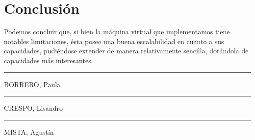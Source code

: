 \documentclass[a4paper,12pt]{article}
\begin{document}
\section{Conclusi\'on}

	Podemos concluir que, si bien la m\'aquina virtual que implementamos tiene notables limitaciones, \'esta posee una buena escalabilidad en cuanto a sus capacidades, pudi\'endose extender de manera relativamente sencilla, dot\'andola de capacidades m\'as interesantes.

\vspace{\fill}

\begin{multicols}{3}

	\hrule
	\vspace{5pt}
	BORRERO, Paula\\
	\linebreak

	\hrule
	\vspace{5pt}
	CRESPO, Lisandro \\
	\linebreak

	\hrule
	\vspace{5pt}
	MISTA, Agust\'in \\
	
\end{multicols}
\end{document}
